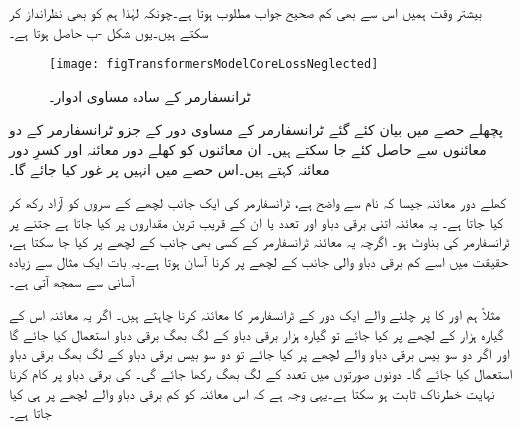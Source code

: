 بیشتر وقت ہمیں اس سے بھی کم صحیح جواب مطلوب ہوتا ہے۔چونکہ   لہٰذا ہم   کو بھی نظرانداز کر سکتے ہیں۔یوں شکل -ب حاصل ہوتا ہے۔
\begin{figure}
\centering
\texttt{[image: figTransformersModelCoreLossNeglected]}
\caption{ٹرانسفارمر کے سادہ مساوی ادوار۔}
\label{شکل_ٹرانسفارمر_سادہ_ماڈل}
\end{figure}
پچھلے حصے میں بیان کئے گئے ٹرانسفارمر کے مساوی دور کے جزو ٹرانسفارمر کے دو معائنوں سے حاصل کئے جا سکتے ہیں۔ ان معائنوں کو کھلے دور معائنہ اور کسرِ دور معائنہ کہتے ہیں۔اس حصے میں انہیں پر غور کیا جائے گا۔

کھلے  دور معائنہ جیسا کہ نام سے واضح  ہے،  ٹرانسفارمر کی ایک جانب لچھے کے سروں کو آزاد رکھ کر کیا جاتا ہے۔ یہ معائنہ اتنی برقی دباو اور تعدد یا ان کے قریب ترین مقداروں پر کیا جاتا ہے جتنے پر ٹرانسفارمر کی بناوٹ ہو۔ اگرچہ یہ معائنہ ٹرانسفارمر کے کسی بھی جانب کے لچھے پر کیا جا سکتا ہے، حقیقت میں اسے کم برقی دباو والی جانب کے لچھے پر کرنا آسان ہوتا ہے۔یہ بات ایک مثال سے زیادہ آسانی سے سمجھ آتی ہے۔

	مثلاً  ہم   اور   کا  پر چلنے والے ایک دور کے ٹرانسفارمر کا معائنہ کرنا چاہتے ہیں۔ اگر یہ معائنہ اس کے گیارہ ہزار کے لچھے پر  کیا جائے تو گیارہ ہزار برقی دباو کے لگ بھگ برقی دباو استعمال کیا جائے گا اور اگر دو سو بیس برقی دباو والے لچھے پر کیا جائے تو دو سو بیس برقی دباو کے لگ بھگ برقی دباو  استعمال کیا جائے گا۔ دونوں صورتوں میں تعدد  کے لگ بھگ رکھا جائے گی۔ کی برقی دباو پر کام کرنا نہایت خطرناک ثابت ہو سکتا ہے۔یہی وجہ ہے کہ اس معائنہ کو کم برقی دباو والے لچھے پر ہی کیا جاتا ہے۔

